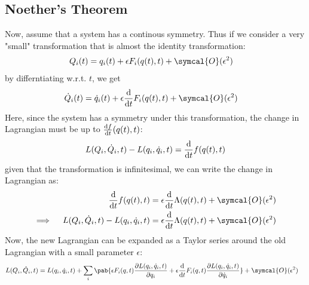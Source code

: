 \subsection{Noether's Theorem}
Now, assume that a system has a continous symmetry.
Thus if we consider a very "small" transformation that is almost the identity transformation:
\begin{align}
  Q_i(t) & = q_i(t) + \epsilon F_i(q(t), t) + \symcal{O}(\epsilon^2)
\end{align}
by differntiating w.r.t. $t$, we get
\begin{align}
  \dot{Q}_i (t) & = \dot{q}_i(t) + \epsilon \odv{}{t} F_i(q(t), t) + \symcal{O}(\epsilon^2)
\end{align}
Here, since the system has a symmetry under this transformation, the change in Lagrangian must be up to $\odv{f}{t} (q(t), t)$:
\begin{align}
  L(Q_i, \dot{Q}_i, t) - L(q_i, \dot{q}_i, t) = \odv{}{t} f(q(t), t)
\end{align}
given that the transformation is infinitesimal, we can write the change in Lagrangian as:
\begin{align}
  \odv{}{t} f(q(t), t)                                       & = \epsilon \odv{}{t} \Lambda(q(t), t) + \symcal{O}(\epsilon^2) \\
  \implies \quad L(Q_i, \dot{Q}_i, t) - L(q_i, \dot{q}_i, t) & = \epsilon \odv{}{t} \Lambda(q(t), t) + \symcal{O}(\epsilon^2)
  \label{eq:change_lagrangian1}
\end{align}
Now, the new Lagrangian can be expanded as a Taylor series around the old Lagrangian with a small parameter $\epsilon$:
\begin{align}
  L(Q_i, \dot{Q}_i, t) & = L(q_i, \dot{q}_i, t) + \sum_i  \pab{
    \epsilon F_i(q, t) \pdv{L(q_i, \dot{q}_i, t)}{q_i} + \epsilon \odv{}{t} F_i(q, t) \pdv{L(q_i, \dot{q}_i, t)}{\dot{q}_i}
  } + \symcal{O}(\epsilon^2)
\end{align}
